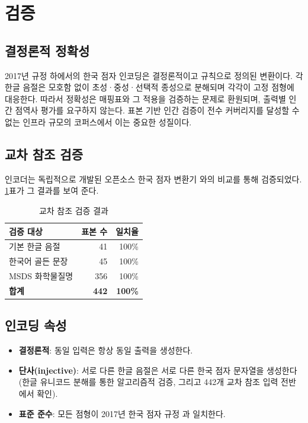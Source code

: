 \documentclass[journal]{IEEEtran}
\begin{document}
\section{검증}
\label{sec:validation}

\subsection{결정론적 정확성}

2017년 규정 하에서의 한국 점자 인코딩은 결정론적이고 규칙으로 정의된 변환이다. 각 한글 음절은 모호함 없이 초성·중성·선택적 종성으로 분해되며 각각이 고정 점형에 대응한다. 따라서 정확성은 매핑표와 그 적용을 검증하는 문제로 환원되며, 출력별 인간 점역사 평가를 요구하지 않는다. 표본 기반 인간 검증이 전수 커버리지를 달성할 수 없는 인프라 규모의 코퍼스에서 이는 중요한 성질이다.

\subsection{교차 참조 검증}

인코더는 독립적으로 개발된 오픈소스 한국 점자 변환기 \cite{hangul_braille_converter}와의 비교를 통해 검증되었다. \ref{tab:validation}표가 그 결과를 보여 준다.

\begin{table}[h]
\centering
\caption{교차 참조 검증 결과}
\label{tab:validation}
\begin{tabular}{lrr}
\toprule
검증 대상 & 표본 수 & 일치율 \\
\midrule
기본 한글 음절 & 41 & 100\% \\
한국어 골든 문장 & 45 & 100\% \\
MSDS 화학물질명 & 356 & 100\% \\
\midrule
\textbf{합계} & \textbf{442} & \textbf{100\%} \\
\bottomrule
\end{tabular}
\end{table}

\subsection{인코딩 속성}

\begin{itemize}
\item \textbf{결정론적}: 동일 입력은 항상 동일 출력을 생성한다.
\item \textbf{단사(injective)}: 서로 다른 한글 음절은 서로 다른 한국 점자 문자열을 생성한다(한글 유니코드 분해를 통한 알고리즘적 검증, 그리고 442개 교차 참조 입력 전반에서 확인).
\item \textbf{표준 준수}: 모든 점형이 2017년 한국 점자 규정 \cite{ko_braille_2017}과 일치한다.
\end{itemize}
\end{document}
